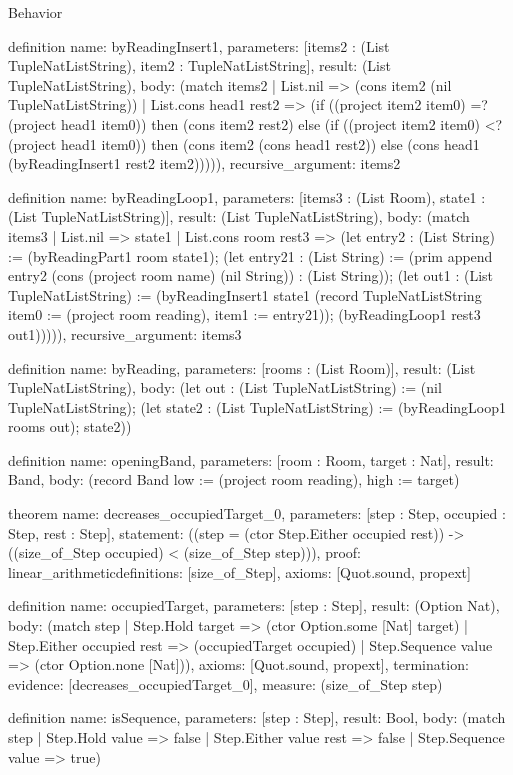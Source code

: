 \begin{lexlean}{Behavior}
\begin{semanticmodule}
definition{
  name: byReadingInsert1,
  parameters: [items2 : (List TupleNatListString), item2 : TupleNatListString],
  result: (List TupleNatListString),
  body: (match items2
    | List.nil => (cons item2 (nil TupleNatListString))
    | List.cons head1 rest2 => (if ((project item2 item0) =? (project head1 item0)) then (cons item2 rest2) else (if ((project item2 item0) <? (project head1 item0)) then (cons item2 (cons head1 rest2)) else (cons head1 (byReadingInsert1 rest2 item2))))),
  recursive_argument: items2
}

definition{
  name: byReadingLoop1,
  parameters: [items3 : (List Room), state1 : (List TupleNatListString)],
  result: (List TupleNatListString),
  body: (match items3
    | List.nil => state1
    | List.cons room rest3 => (let entry2 : (List String) := (byReadingPart1 room state1); (let entry21 : (List String) := (prim append entry2 (cons (project room name) (nil String)) : (List String)); (let out1 : (List TupleNatListString) := (byReadingInsert1 state1 (record TupleNatListString {item0 := (project room reading), item1 := entry21})); (byReadingLoop1 rest3 out1))))),
  recursive_argument: items3
}

definition{
  name: byReading,
  parameters: [rooms : (List Room)],
  result: (List TupleNatListString),
  body: (let out : (List TupleNatListString) := (nil TupleNatListString); (let state2 : (List TupleNatListString) := (byReadingLoop1 rooms out); state2))
}

definition{
  name: openingBand,
  parameters: [room : Room, target : Nat],
  result: Band,
  body: (record Band {low := (project room reading), high := target})
}

theorem{
  name: decreases_occupiedTarget_0,
  parameters: [step : Step, occupied : Step, rest : Step],
  statement: ((step = (ctor Step.Either occupied rest)) -> ((size_of_Step occupied) < (size_of_Step step))),
  proof: linear_arithmetic{definitions: [size_of_Step]},
  axioms: [Quot.sound, propext]
}

definition{
  name: occupiedTarget,
  parameters: [step : Step],
  result: (Option Nat),
  body: (match step
    | Step.Hold target => (ctor Option.some [Nat] target)
    | Step.Either occupied rest => (occupiedTarget occupied)
    | Step.Sequence value => (ctor Option.none [Nat])),
  axioms: [Quot.sound, propext],
  termination: {evidence: [decreases_occupiedTarget_0], measure: (size_of_Step step)}
}

definition{
  name: isSequence,
  parameters: [step : Step],
  result: Bool,
  body: (match step
    | Step.Hold value => false
    | Step.Either value rest => false
    | Step.Sequence value => true)
}


\end{semanticmodule}
\end{lexlean}
